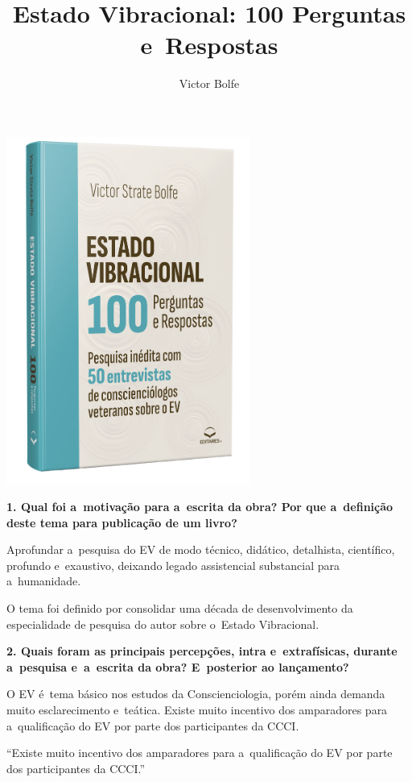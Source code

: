 \documentclass{gescons}
\author{Victor Bolfe}
\title{Estado Vibracional: 100 Perguntas e~Respostas}
\begin{document}
    \makeentrevistatitle

    \begin{multicols}{2}


\begin{center}
    \includegraphics[width=8cm]{articles/entrevista/mockups/Victor-Bolfe.png}
\end{center}

\textbf{1. Qual foi a~motivação para a~escrita da obra? Por que a~definição deste tema para publicação de um livro?}

Aprofundar a~pesquisa do EV de modo técnico, didático, detalhista, científico, profundo e~exaustivo, deixando legado assistencial substancial para a~humanidade. 

O tema foi definido por consolidar uma década de desenvolvimento da especialidade de pesquisa do autor sobre o~Estado Vibracional. 

\textbf{2. Quais foram as principais percepções, intra e~extrafísicas, durante a~pesquisa e~a~escrita da obra? E~posterior ao lançamento?}

O EV é~tema básico nos estudos da Conscienciologia, porém ainda demanda muito esclarecimento e~teática. Existe muito incentivo dos amparadores para a~qualificação do EV por parte dos participantes da CCCI. 

\begin{pullquote}
    ``Existe muito incentivo dos amparadores para a~qualificação do EV por parte dos participantes da CCCI.''
\end{pullquote}



\end{multicols}
\end{document}
